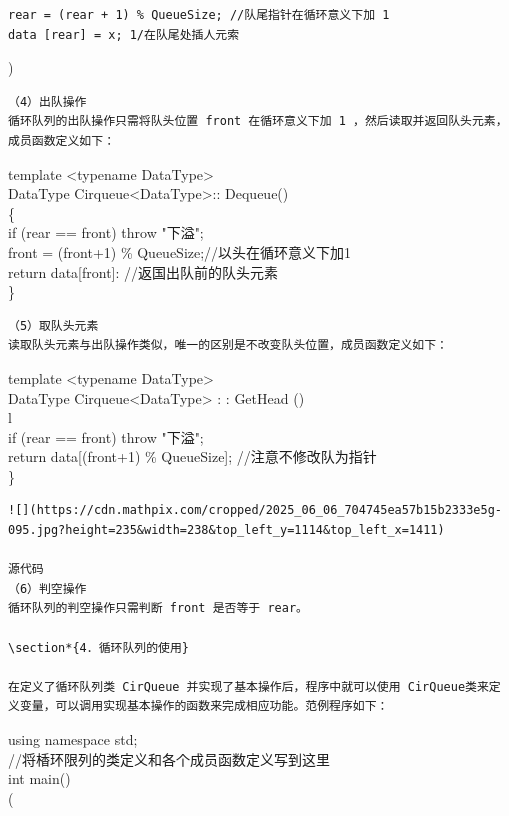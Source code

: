 \documentclass[10pt]{article}
\begin{document}
\begin{verbatim}
rear = (rear + 1) % QueueSize; //队尾指针在循环意义下加 1
data [rear] = x; 1/在队尾处插人元索
\end{verbatim}

)

\begin{verbatim}
（4）出队操作
循环队列的出队操作只需将队头位置 front 在循环意义下加 1 ，然后读取并返回队头元素，成员函数定义如下：
\end{verbatim}

template <typename DataType>\\
DataType Cirqueue<DataType>:: Dequeue()\\
\{\\
if (rear == front) throw "下溢";\\
front = (front+1) \% QueueSize;//以头在循环意义下加1\\[0pt]
return data[front]: //返国出队前的队头元素\\
\}

\begin{verbatim}
（5）取队头元素
读取队头元素与出队操作类似，唯一的区别是不改变队头位置，成员函数定义如下：
\end{verbatim}

template <typename DataType>\\
DataType Cirqueue<DataType> : : GetHead ()\\
l\\
if (rear == front) throw "下溢";\\[0pt]
return data[(front+1) \% QueueSize]; //注意不修改队为指针\\
\}

\begin{verbatim}
![](https://cdn.mathpix.com/cropped/2025_06_06_704745ea57b15b2333e5g-095.jpg?height=235&width=238&top_left_y=1114&top_left_x=1411)

源代码
（6）判空操作
循环队列的判空操作只需判断 front 是否等于 rear。

\section*{4．循环队列的使用}

在定义了循环队列类 CirQueue 并实现了基本操作后，程序中就可以使用 CirQueue类来定义变量，可以调用实现基本操作的函数来完成相应功能。范例程序如下：
\end{verbatim}

using namespace std;\\
//将楿环限列的类定义和各个成员函数定义写到这里\\
int main()\\
(
\end{document}

